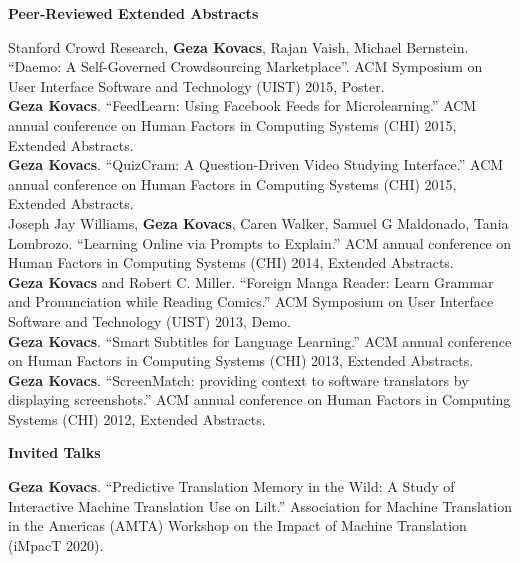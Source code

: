 \documentclass[10pt,A4]{article}
\newcommand{\cvsection}[1]
{
	\begin{center}
		\large\textcolor{sectcol}{\textbf{#1}}
	\end{center}
}
\begin{document}
\cvsection{Peer-Reviewed Extended Abstracts}

Stanford Crowd Research, \textbf{Geza Kovacs}, Rajan Vaish, Michael Bernstein. ``Daemo: A Self-Governed Crowdsourcing Marketplace''. ACM Symposium on User Interface Software and Technology (UIST) 2015, Poster.\\

\textbf{Geza Kovacs}. ``FeedLearn: Using Facebook Feeds for Microlearning.'' ACM annual conference on Human Factors in Computing Systems (CHI) 2015, Extended Abstracts.\\ %

\textbf{Geza Kovacs}. ``QuizCram: A Question-Driven Video Studying Interface.'' ACM annual conference on Human Factors in Computing Systems (CHI) 2015, Extended Abstracts.\\

Joseph Jay Williams, \textbf{Geza Kovacs}, Caren Walker, Samuel G Maldonado, Tania Lombrozo. ``Learning Online via Prompts to Explain.'' ACM annual conference on Human Factors in Computing Systems (CHI) 2014, Extended Abstracts.\\

\textbf{Geza Kovacs} and Robert C. Miller. ``Foreign Manga Reader: Learn Grammar and Pronunciation while Reading Comics.'' ACM Symposium on User Interface Software and Technology (UIST) 2013, Demo.\\

\textbf{Geza Kovacs}. ``Smart Subtitles for Language Learning.'' ACM annual conference on Human Factors in Computing Systems (CHI) 2013, Extended Abstracts.\\ %

\textbf{Geza Kovacs}. ``ScreenMatch: providing context to software translators by displaying screenshots.'' ACM annual conference on Human Factors in Computing Systems (CHI) 2012, Extended Abstracts.\\ %


\cvsection{Invited Talks}

\textbf{Geza Kovacs}. ``Predictive Translation Memory in the Wild: A Study of Interactive Machine Translation Use on Lilt.'' Association for Machine Translation in the Americas (AMTA) Workshop on the Impact of Machine Translation (iMpacT 2020).\\
\end{document}

